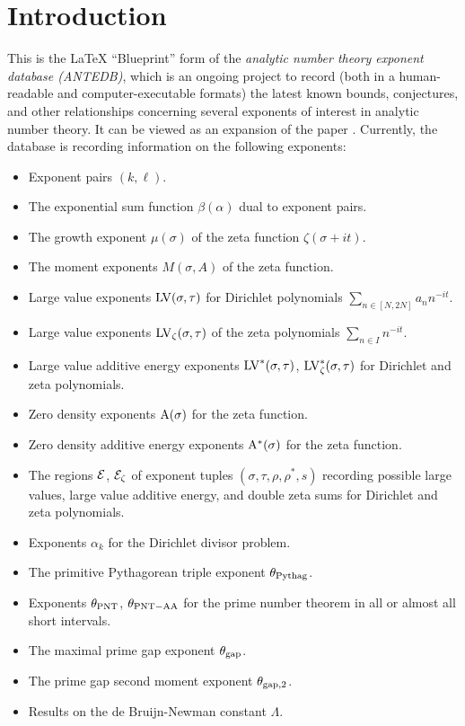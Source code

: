 \chapter{Introduction}\label{intro-chapter}

This is the LaTeX ``Blueprint'' form of the \emph{analytic number theory exponent database (ANTEDB)}, which is an ongoing project to record (both in a human-readable and computer-executable formats) the latest known bounds, conjectures, and other relationships concerning several exponents of interest in analytic number theory.  It can be viewed as an expansion of the paper \cite{trudgian-yang}. Currently, the database is recording information on the following exponents:

\begin{itemize}
\item Exponent pairs $(k,\ell)$.
\item The exponential sum function $\beta(\alpha)$ dual to exponent pairs.
\item The growth exponent $\mu(\sigma)$ of the zeta function $\zeta(\sigma+it)$.
\item The moment exponents $M(\sigma,A)$ of the zeta function.
\item Large value exponents $\mathrm{LV}(\sigma, \tau)$ for Dirichlet polynomials $\sum_{n \in [N,2N]} a_n n^{-it}$.
\item Large value exponents $\mathrm{LV}_\zeta(\sigma, \tau)$ of the zeta polynomials $\sum_{n \in I} n^{-it}$.
\item Large value additive energy exponents $\mathrm{LV}^*(\sigma, \tau)$, $\mathrm{LV}^*_\zeta(\sigma, \tau)$ for Dirichlet and zeta polynomials.
\item Zero density exponents $\mathrm{A}(\sigma)$ for the zeta function.
\item Zero density additive energy exponents $\mathrm{A}^*(\sigma)$ for the zeta function.
\item The regions $\mathcal{E}$, $\mathcal{E}_\zeta$ of exponent tuples $(\sigma,\tau,\rho,\rho^*,s)$ recording possible large values, large value additive energy, and double zeta sums for Dirichlet and zeta polynomials.
\item Exponents $\alpha_k$ for the Dirichlet divisor problem.
\item The primitive Pythagorean triple exponent $\theta_{\mathrm{Pythag}}$.
\item Exponents $\theta_{\mathrm{PNT}}$, $\theta_{\mathrm{PNT-AA}}$ for the prime number theorem in all or almost all short intervals.
\item The maximal prime gap exponent $\theta_{\mathrm{gap}}$.
\item The prime gap second moment exponent $\theta_{\mathrm{gap},2}$.
\item Results on the de Bruijn-Newman constant $\Lambda$.
\end{itemize}

